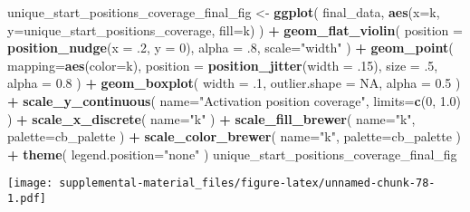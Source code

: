 \documentclass[]{book}
\newenvironment{Shaded}{\begin{snugshade}}{\end{snugshade}}
\newcommand{\DataTypeTok}[1]{\textcolor[rgb]{0.13,0.29,0.53}{#1}}
\newcommand{\DecValTok}[1]{\textcolor[rgb]{0.00,0.00,0.81}{#1}}
\newcommand{\FloatTok}[1]{\textcolor[rgb]{0.00,0.00,0.81}{#1}}
\newcommand{\KeywordTok}[1]{\textcolor[rgb]{0.13,0.29,0.53}{\textbf{#1}}}
\newcommand{\NormalTok}[1]{#1}
\newcommand{\OperatorTok}[1]{\textcolor[rgb]{0.81,0.36,0.00}{\textbf{#1}}}
\newcommand{\OtherTok}[1]{\textcolor[rgb]{0.56,0.35,0.01}{#1}}
\newcommand{\StringTok}[1]{\textcolor[rgb]{0.31,0.60,0.02}{#1}}
\begin{document}
\begin{Shaded}
\begin{Highlighting}[]
\NormalTok{unique_start_positions_coverage_final_fig <-}\StringTok{ }\KeywordTok{ggplot}\NormalTok{(}
\NormalTok{    final_data,}
    \KeywordTok{aes}\NormalTok{(}\DataTypeTok{x=}\NormalTok{k, }\DataTypeTok{y=}\NormalTok{unique_start_positions_coverage, }\DataTypeTok{fill=}\NormalTok{k)}
\NormalTok{  ) }\OperatorTok{+}
\StringTok{  }\KeywordTok{geom_flat_violin}\NormalTok{(}
    \DataTypeTok{position =} \KeywordTok{position_nudge}\NormalTok{(}\DataTypeTok{x =} \FloatTok{.2}\NormalTok{, }\DataTypeTok{y =} \DecValTok{0}\NormalTok{),}
    \DataTypeTok{alpha =} \FloatTok{.8}\NormalTok{,}
    \DataTypeTok{scale=}\StringTok{"width"}
\NormalTok{  ) }\OperatorTok{+}
\StringTok{  }\KeywordTok{geom_point}\NormalTok{(}
    \DataTypeTok{mapping=}\KeywordTok{aes}\NormalTok{(}\DataTypeTok{color=}\NormalTok{k),}
    \DataTypeTok{position =} \KeywordTok{position_jitter}\NormalTok{(}\DataTypeTok{width =} \FloatTok{.15}\NormalTok{),}
    \DataTypeTok{size =} \FloatTok{.5}\NormalTok{,}
    \DataTypeTok{alpha =} \FloatTok{0.8}
\NormalTok{  ) }\OperatorTok{+}
\StringTok{  }\KeywordTok{geom_boxplot}\NormalTok{(}
    \DataTypeTok{width =} \FloatTok{.1}\NormalTok{,}
    \DataTypeTok{outlier.shape =} \OtherTok{NA}\NormalTok{,}
    \DataTypeTok{alpha =} \FloatTok{0.5}
\NormalTok{  ) }\OperatorTok{+}
\StringTok{  }\KeywordTok{scale_y_continuous}\NormalTok{(}
    \DataTypeTok{name=}\StringTok{"Activation position coverage"}\NormalTok{,}
    \DataTypeTok{limits=}\KeywordTok{c}\NormalTok{(}\DecValTok{0}\NormalTok{, }\FloatTok{1.0}\NormalTok{)}
\NormalTok{  ) }\OperatorTok{+}
\StringTok{  }\KeywordTok{scale_x_discrete}\NormalTok{(}
    \DataTypeTok{name=}\StringTok{"k"}
\NormalTok{  ) }\OperatorTok{+}
\StringTok{  }\KeywordTok{scale_fill_brewer}\NormalTok{(}
    \DataTypeTok{name=}\StringTok{"k"}\NormalTok{,}
    \DataTypeTok{palette=}\NormalTok{cb_palette}
\NormalTok{  ) }\OperatorTok{+}
\StringTok{  }\KeywordTok{scale_color_brewer}\NormalTok{(}
    \DataTypeTok{name=}\StringTok{"k"}\NormalTok{,}
    \DataTypeTok{palette=}\NormalTok{cb_palette}
\NormalTok{  ) }\OperatorTok{+}
\StringTok{  }\KeywordTok{theme}\NormalTok{(}
    \DataTypeTok{legend.position=}\StringTok{"none"}
\NormalTok{  )}
\NormalTok{unique_start_positions_coverage_final_fig}
\end{Highlighting}
\end{Shaded}

\texttt{[image: supplemental-material\_files/figure-latex/unnamed-chunk-78-1.pdf]}
\end{document}
